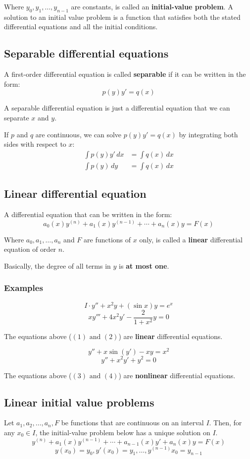 \documentclass[11pt]{article}
\begin{document}
Where \(y_0, y_1, \ldots, y_{n-1}\) are constants, is called an \textbf{initial-value problem}. A solution to an initial value problem is a function that satisfies both the stated differential equations and all the initial conditions.
\subsection{Separable differential equations}
\label{sec:org1ca15d9}
A first-order differential equation is called \textbf{separable} if it can be written in the form:
\[p(y) y' = q(x)\]

A separable differential equation is just a differential equation that we can separate \(x\) and \(y\).


If \(p\) and \(q\) are continuous, we can solve \(p(y) y' = q(x)\) by integrating both sides with respect to \(x\):
\begin{align*}
\int p(y) y' \, dx &= \int q(x) \, dx \\
\int p(y) \, dy &= \int q(x) \, dx
\end{align*}

\newpage
\subsection{Linear differential equation}
\label{sec:orgc6dcd66}
A differential equation that can be written in the form:
\[a_0 (x) y^{(n)} + a_1 (x) y^{(n - 1)} + \cdots + a_n (x) y = F(x)\]

Where \(a_0, a_1, \ldots, a_n\) and \(F\) are functions of \(x\) only, is called a \textbf{linear} differential equation of order \(n\).


Basically, the degree of all terms in \(y\) is \textbf{at most one}.
\subsubsection{Examples}
\label{sec:orged4d099}
\[I \cdot y'' + x^2 y + (\sin x) y = e^x \tag{1}\]
\[xy''' + 4x^2 y' - \frac{2}{1+ x^2} y = 0 \tag{2}\]

The equations above (\((1) \text{ and } (2)\)) are \textbf{linear} differential equations.

\[y'' + x \sin (y') - xy = x^2 \tag{3}\]
\[y'' + x^2y' + y^2 = 0 \tag{4}\]

The equations above (\((3) \text{ and } (4)\)) are \textbf{nonlinear} differential equations.
\subsection{Linear initial value problems}
\label{sec:org8654998}
Let \(a_1, a_2, \ldots, a_n, F\) be functions that are continuous on an interval \(I\). Then, for any \(x_0 \in I\), the initial-value problem below has a unique solution on \(I\).
\[y^{(n)} + a_1 (x) y^{(n - 1)} + \cdots + a_{n - 1}(x) y' + a_n (x) y = F(x)\]
\[y(x_0) = y_0, y'(x_0) = y_1, \ldots, y^{(n - 1)} x_0 = y_{n - 1}\]
\end{document}
